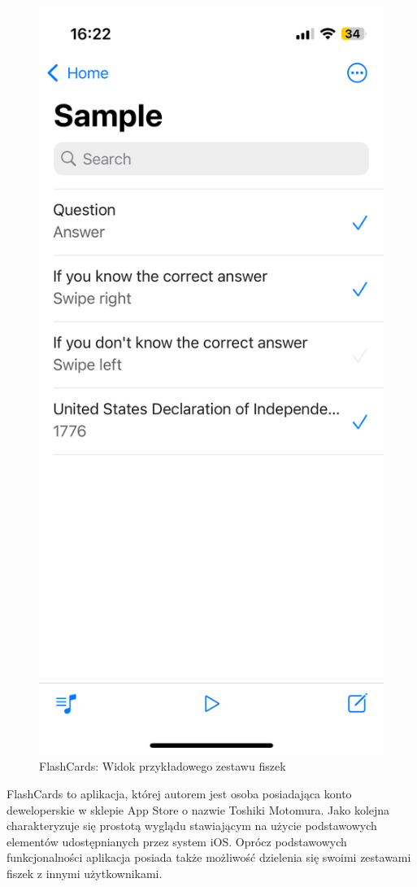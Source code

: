 \documentclass[final,a4paper,openany,12pt]{mwbk}
\begin{document}
\begin{figure}[H]
\begin{minipage}{0.5\textwidth}
  \includegraphics[width=.75\linewidth]{img/flashcards2.PNG}
  \caption{FlashCards: Widok przykładowego zestawu fiszek}
  \label{fig:flashcards2}
\end{minipage}
\end{figure}

FlashCards \cite{flashcards_appstore} to aplikacja, której autorem jest osoba posiadająca konto deweloperskie w sklepie App Store o nazwie Toshiki Motomura. Jako kolejna charakteryzuje się prostotą wyglądu stawiającym na użycie podstawowych elementów udostępnianych przez system iOS. Oprócz podstawowych funkcjonalności aplikacja posiada także możliwość dzielenia się swoimi zestawami fiszek z innymi użytkownikami.
\end{document}

